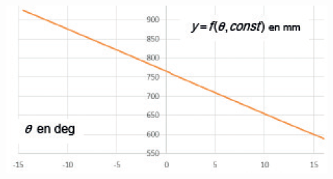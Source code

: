 \documentclass[10pt,fleqn]{article} %
\begin{document}
\begin{multicols}{2}
\begin{center}
\includegraphics[width=\linewidth]{images/fig_06}
\end{center}


\ifprof
\else
\end{multicols}
\fi
\end{document}
